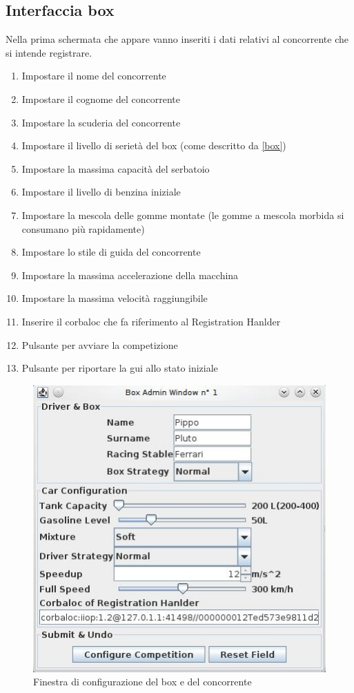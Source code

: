 \subsection{Interfaccia box}
Nella prima schermata che appare vanno inseriti i dati relativi al concorrente che si intende registrare.
\begin{enumerate}
\item Impostare il nome del concorrente
\item Impostare il cognome del concorrente
\item Impostare la scuderia del concorrente
\item Impostare il livello di seriet\`{a} del box (come descritto da \ref{box})
\item Impostare la massima capacit\`{a} del serbatoio
\item Impostare il livello di benzina iniziale
\item Impostare la mescola delle gomme montate (le gomme a mescola morbida si consumano pi\`{u} rapidamente)
\item Impostare lo stile di guida del concorrente 
\item Impostare la massima accelerazione della macchina
\item Impostare la massima velocit\`{a} raggiungibile
\item Inserire il corbaloc che fa riferimento al Registration Hanlder
\item Pulsante per avviare la competizione
\item Pulsante per riportare la gui allo stato iniziale
\end{enumerate}
\begin{center}
\begin{figure}[H]
	\includegraphics[scale=0.75]{img/ScreenshotRelazione/BoxAdminWindows.jpg}
	\caption{Finestra di configurazione del box e del concorrente}
\end{figure}
\end{center}
